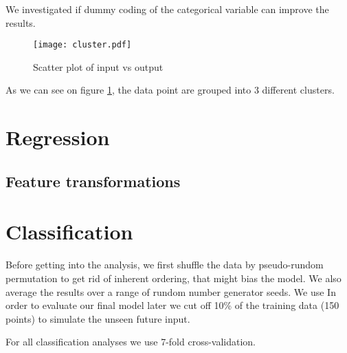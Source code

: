 \documentclass{article} %
\begin{document}
We investigated if dummy coding of the categorical variable can improve the results.

\begin{figure}[h]	
	\centering
	\texttt{[image: cluster.pdf]}
	\caption{Scatter plot of input vs output}
	\label{fig:scatterIO}
\end{figure}
As we can see on figure \ref{fig:scatterIO}, the data point are grouped into 3 different clusters.



\section{Regression}

\subsection{Feature transformations}

\section{Classification}

Before getting into the analysis, we first shuffle the data by pseudo-rundom permutation to get rid of inherent ordering, that might bias the model. We also average the results over a range of rundom number generator seeds. We use In order to evaluate our final model later we cut off 10\% of the training data (150 points) to simulate the unseen future input.

For all classification analyses we use 7-fold cross-validation. 
\end{document}
